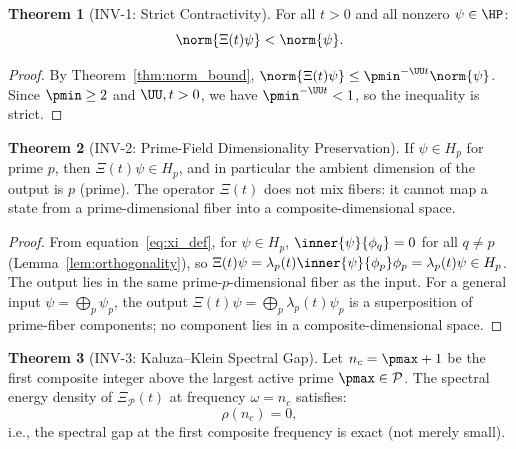 \documentclass[12pt,letterpaper]{article}
\theoremstyle{definition}
\newtheorem{theorem}{Theorem}[section]
\theoremstyle{remark}
\begin{document}
\begin{theorem}[INV-1: Strict Contractivity]
\label{thm:inv1}
For all $t > 0$ and all nonzero $\psi \in \HP$:
\begin{equation}
  \norm{\Xi(t)\psi} < \norm{\psi}.
\end{equation}
\end{theorem}

\begin{proof}
By Theorem~\ref{thm:norm_bound}, $\norm{\Xi(t)\psi}
\leq \pmin^{-\UU t}\norm{\psi}$. Since $\pmin \geq 2$ and $\UU, t > 0$,
we have $\pmin^{-\UU t} < 1$, so the inequality is strict.
\end{proof}

\begin{theorem}[INV-2: Prime-Field Dimensionality Preservation]
\label{thm:inv2}
If $\psi \in H_p$ for prime $p$, then $\Xi(t)\psi \in H_p$,
and in particular the ambient dimension of the output is $p$ (prime).
The operator $\Xi(t)$ does not mix fibers: it cannot map a state
from a prime-dimensional fiber into a composite-dimensional space.
\end{theorem}

\begin{proof}
From equation~\eqref{eq:xi_def}, for $\psi \in H_p$,
$\inner{\psi}{\phi_q} = 0$ for all $q \neq p$ (Lemma~\ref{lem:orthogonality}),
so $\Xi(t)\psi = \lambda_p(t)\inner{\psi}{\phi_p}\phi_p = \lambda_p(t)\psi \in H_p$.
The output lies in the same prime-$p$-dimensional fiber as the input.
For a general input $\psi = \bigoplus_p \psi_p$, the output
$\Xi(t)\psi = \bigoplus_p \lambda_p(t)\psi_p$ is a superposition of
prime-fiber components; no component lies in a composite-dimensional space.
\end{proof}

\begin{theorem}[INV-3: Kaluza--Klein Spectral Gap]
\label{thm:inv3}
Let $n_c = \pmax + 1$ be the first composite integer above the largest active prime
$\pmax \in \mathcal{P}$. The spectral energy density of $\Xi_\mathcal{P}(t)$
at frequency $\omega = n_c$ satisfies:
\begin{equation}
  \rho(n_c) = 0,
\end{equation}
i.e., the spectral gap at the first composite frequency is exact (not merely small).
\end{theorem}
\end{document}
